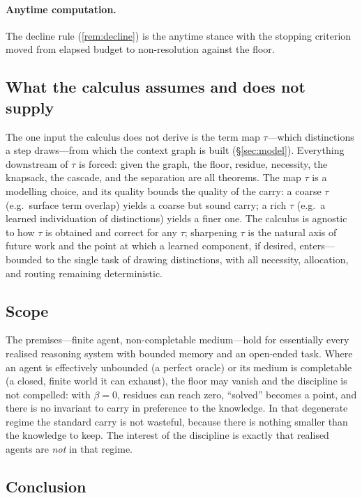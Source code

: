 \documentclass[11pt,twocolumn,a4paper]{article}
\theoremstyle{thmstyle}
\theoremstyle{definition}
\theoremstyle{remark}
\newcommand{\flo}{\beta}                %
\begin{document}
\paragraph{Anytime computation.} The decline rule (\cref{rem:decline}) is the
anytime stance \citep{dean1988,zilberstein1996} with the stopping criterion moved
from elapsed budget to non-resolution against the floor.

\subsection{What the calculus assumes and does not supply}

The one input the calculus does not derive is the term map $\tau$---which
distinctions a step draws---from which the context graph is built
(\S\ref{sec:model}). Everything downstream of $\tau$ is forced: given the graph,
the floor, residue, necessity, the knapsack, the cascade, and the separation are
all theorems. The map $\tau$ is a modelling choice, and its quality bounds the
quality of the carry: a coarse $\tau$ (e.g.\ surface term overlap) yields a coarse
but sound carry; a rich $\tau$ (e.g.\ a learned individuation of distinctions)
yields a finer one. The calculus is agnostic to how $\tau$ is obtained and correct
for any $\tau$; sharpening $\tau$ is the natural axis of future work and the point
at which a learned component, if desired, enters---bounded to the single task of
drawing distinctions, with all necessity, allocation, and routing remaining
deterministic.

\subsection{Scope}

The premises---finite agent, non-completable medium---hold for essentially every
realised reasoning system with bounded memory and an open-ended task. Where an
agent is effectively unbounded (a perfect oracle) or its medium is completable (a
closed, finite world it can exhaust), the floor may vanish and the discipline is
not compelled: with $\flo=0$, residues can reach zero, ``solved'' becomes a point,
and there is no invariant to carry in preference to the knowledge. In that
degenerate regime the standard carry is not wasteful, because there is nothing
smaller than the knowledge to keep. The interest of the discipline is exactly
that realised agents are \emph{not} in that regime.

\subsection{Conclusion}
\end{document}
